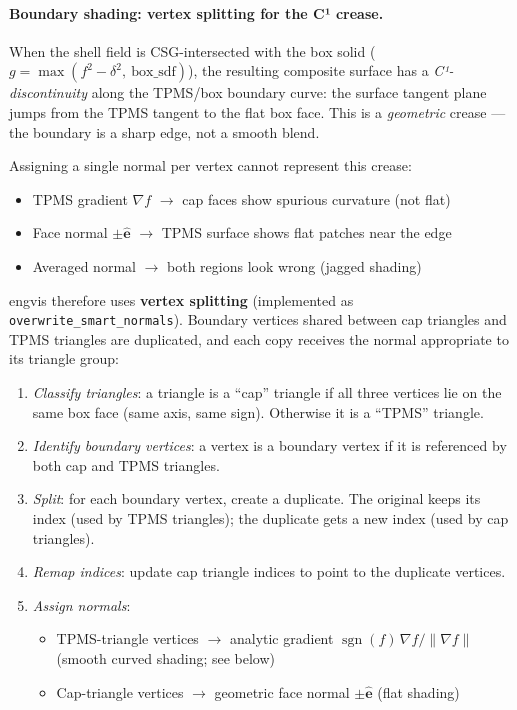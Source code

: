 \documentclass[11pt]{article}
\begin{document}
\paragraph{Boundary shading: vertex splitting for the C¹ crease.}
\label{sec:smart-normals}
When the shell field is CSG-intersected with the box solid
($g = \max(f^2-\delta^2,\ \text{box\_sdf})$), the resulting composite
surface has a \emph{C¹-discontinuity} along the TPMS/box boundary
curve: the surface tangent plane jumps from the TPMS tangent to the
flat box face.  This is a \emph{geometric} crease --- the boundary is a
sharp edge, not a smooth blend.

Assigning a single normal per vertex cannot represent this crease:
\begin{itemize}
  \item TPMS gradient $\nabla f$ $\to$ cap faces show spurious curvature
        (not flat)
  \item Face normal $\pm\hat{\mathbf{e}}$ $\to$ TPMS surface shows flat
        patches near the edge
  \item Averaged normal $\to$ both regions look wrong (jagged shading)
\end{itemize}

engvis therefore uses \textbf{vertex splitting} (implemented as
\texttt{overwrite\_smart\_normals}).  Boundary vertices shared between
cap triangles and TPMS triangles are duplicated, and each copy receives
the normal appropriate to its triangle group:

\begin{enumerate}[leftmargin=2em]
  \item \emph{Classify triangles}: a triangle is a ``cap'' triangle if
        all three vertices lie on the same box face (same axis, same
        sign).  Otherwise it is a ``TPMS'' triangle.
  \item \emph{Identify boundary vertices}: a vertex is a boundary
        vertex if it is referenced by both cap and TPMS triangles.
  \item \emph{Split}: for each boundary vertex, create a duplicate.
        The original keeps its index (used by TPMS triangles); the
        duplicate gets a new index (used by cap triangles).
  \item \emph{Remap indices}: update cap triangle indices to point to
        the duplicate vertices.
  \item \emph{Assign normals}:
    \begin{itemize}
      \item TPMS-triangle vertices $\to$ analytic gradient
            $\operatorname{sgn}(f)\,\nabla f / \|\nabla f\|$
            (smooth curved shading; see below)
      \item Cap-triangle vertices $\to$ geometric face normal
            $\pm\hat{\mathbf{e}}$ (flat shading)
    \end{itemize}
\end{enumerate}
\end{document}
